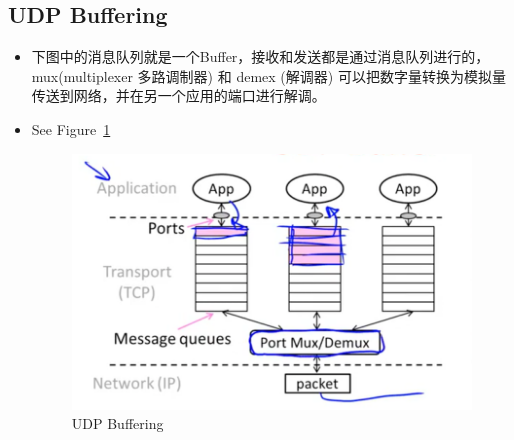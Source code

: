 \documentclass[12pt]{ctexart}   %
\begin{document}
	\subsection{ UDP Buffering }
	\begin{itemize}
		\item 下图中的消息队列就是一个Buffer，接收和发送都是通过消息队列进行的，mux(multiplexer 多路调制器) 和 demex (解调器) 可以把数字量转换为模拟量传送到网络，并在另一个应用的端口进行解调。
		\item See Figure~\ref{fig:6-2-3}
		 
		 \begin{figure}[h!] %
		\centering
		 \includegraphics[scale=0.7]{images/6-2-3}
		\caption{ UDP Buffering }
		 \label{fig:6-2-3}
		 \end{figure}
	\end{itemize}
	
\end{document}
